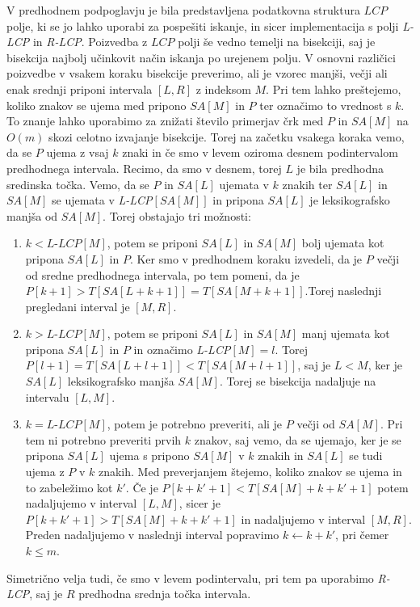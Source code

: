 V predhodnem podpoglavju je bila predstavljena podatkovna struktura $LCP$ polje, ki se jo lahko uporabi za pospešiti iskanje, in sicer implementacija s polji \textit{L-LCP} in \textit{R-LCP}. Poizvedba z $LCP$ polji še vedno temelji na bisekciji, saj je bisekcija najbolj učinkovit način iskanja po urejenem polju. V osnovni različici poizvedbe v vsakem koraku bisekcije preverimo, ali je vzorec manjši, večji ali enak srednji priponi intervala $[L,R]$ z indeksom $M$. Pri tem lahko preštejemo, koliko znakov se ujema med pripono $SA[M]$ in $P$ ter označimo to vrednost s $k$. To znanje lahko uporabimo za znižati število primerjav črk med $P$ in $SA[M]$ na $O(m)$ skozi celotno izvajanje bisekcije. Torej na začetku vsakega koraka vemo, da se $P$ ujema z vsaj $k$ znaki in če smo v levem oziroma desnem podintervalom predhodnega intervala. Recimo, da smo v desnem, torej $L$ je bila predhodna sredinska točka. Vemo, da se $P$ in $SA[L]$ ujemata v $k$ znakih ter $SA[L]$ in $SA[M]$ se ujemata v \textit{L-LCP}$[SA[M]]$ in pripona $SA[L]$ je leksikografsko manjša od $SA[M]$. Torej obstajajo tri možnosti:
\begin{enumerate}
    \item $k<\textit{L-LCP}[M]$, potem se priponi $SA[L]$ in $SA[M]$ bolj ujemata kot pripona $SA[L]$ in $P$. Ker smo v predhodnem koraku izvedeli, da je $P$ večji od sredne predhodnega intervala, po tem pomeni, da je $P[k+1]>T[SA[L+k+1]]=T[SA[M+k+1]]$.Torej naslednji pregledani interval je $[M,R]$.
    \item $k>\textit{L-LCP}[M]$, potem se priponi $SA[L]$ in $SA[M]$ manj ujemata kot pripona $SA[L]$ in $P$ in označimo \textit{L-LCP}$[M]=l$. Torej $P[l+1]=T[SA[L+l+1]]<T[SA[M+l+1]]$, saj je $L<M$, ker je $SA[L]$ leksikografsko manjša $SA[M]$. Torej se bisekcija nadaljuje na intervalu $[L,M]$.
    \item $k=\textit{L-LCP}[M]$, potem je potrebno preveriti, ali je $P$ večji od $SA[M]$. Pri tem ni potrebno preveriti prvih $k$ znakov, saj vemo, da se ujemajo, ker je se pripona $SA[L]$ ujema s pripono $SA[M]$ v $k$ znakih in $SA[L]$ se tudi ujema z $P$ v $k$ znakih. Med preverjanjem štejemo, koliko znakov se ujema in to zabeležimo kot $k'$. Če je $P[k+k'+1]<T[SA[M]+k+k'+1]$ potem nadaljujemo v interval $[L,M]$, sicer je $P[k+k'+1]>T[SA[M]+k+k'+1]$ in nadaljujemo v interval $[M,R]$. Preden nadaljujemo v naslednji interval popravimo $k\leftarrow k+k'$, pri čemer $k\le m$.
\end{enumerate}
Simetrično velja tudi, če smo v levem podintervalu, pri tem pa uporabimo \textit{R-LCP}, saj je $R$ predhodna srednja točka intervala.

